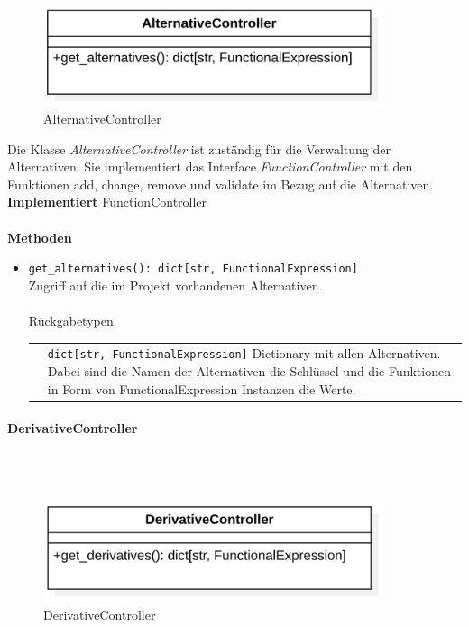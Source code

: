 \documentclass{article}
\newcommand{\classheader}[2][]{\paragraph{#2}
\mbox{}\textit{#1}\\\\}
\begin{document}
\begin{figure}[H]%
    \centering
    \includegraphics[width=10cm]{entwurf/Floriane/AlternativeController.png}
    \caption{AlternativeController}
\end{figure}

Die Klasse \textit{AlternativeController} ist zuständig für die Verwaltung der Alternativen. Sie implementiert das Interface \textit{FunctionController} mit den Funktionen add, change, remove und validate im Bezug auf die Alternativen.
\newline\newline
\textbf{\large{Implementiert}} FunctionController \\\\
\textbf{\large{Methoden}}
\begin{itemize}
\item \texttt{get\_alternatives(): dict[str, FunctionalExpression]}\\ Zugriff auf die im Projekt vorhandenen Alternativen.\\\\
\underline{{Rückgabetypen}}\\
\begin{tabular}{lp{10.7cm}}
 & \texttt{dict[str, FunctionalExpression]}  Dictionary mit allen Alternativen. Dabei sind die Namen der Alternativen die Schlüssel und die Funktionen in Form von FunctionalExpression Instanzen die Werte.\\
\end{tabular}
\end{itemize}


\newpage
\classheader{DerivativeController}\label{cls:DerivativeController}

\begin{figure}[H]%
    \centering
    \includegraphics[width=10cm]{entwurf/Floriane/DerivativeController.png}
    \caption{DerivativeController}
\end{figure}
\end{document}
